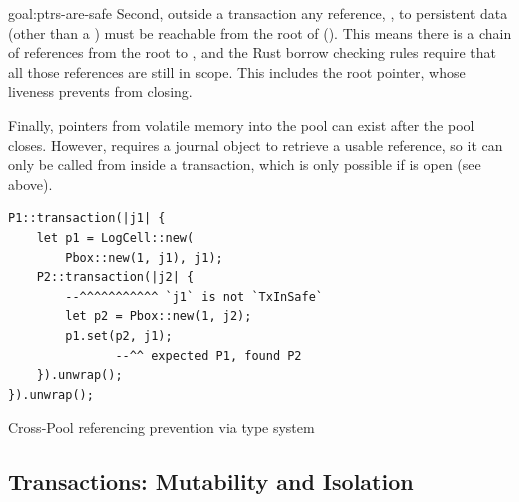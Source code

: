 \begin{goaltrue}{goal:ptrs-are-safe}
Second, outside a transaction any reference, , to persistent data
(other than a ) must be reachable from the root of 
().  This means there is a chain of references
from the root to , and the Rust borrow checking rules require that all
those references are still in scope.  This includes the root pointer, whose
liveness prevents  from closing.

Finally,  pointers from volatile memory into the pool can exist
after the pool closes.  However,  requires a journal
object to retrieve a usable reference, so it can only be called from inside a
transaction, which is only possible if  is open (see above).


\begin{lstfloat}
\begin{lstlisting}
P1::transaction(|j1| {
    let p1 = LogCell::new(
        Pbox::new(1, j1), j1);
    P2::transaction(|j2| {
        --^^^^^^^^^^^ `j1` is not `TxInSafe`
        let p2 = Pbox::new(1, j2);
        p1.set(p2, j1);
               --^^ expected P1, found P2
    }).unwrap();
}).unwrap();
\end{lstlisting}
\caption{Cross-Pool referencing prevention via type system}
\label{lst:cross}
\end{lstfloat}

\end{goaltrue}
  
\subsection{Transactions: Mutability and Isolation}

